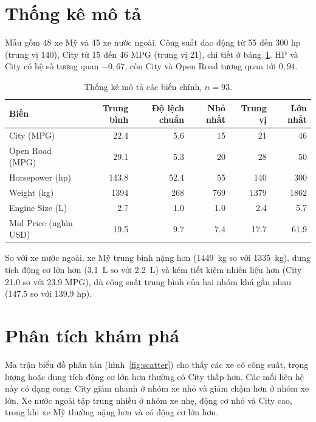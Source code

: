 \documentclass[12pt,a4paper]{report}
\begin{document}
\section{Thống kê mô tả}

Mẫu gồm 48 xe Mỹ và 45 xe nước ngoài. Công suất dao động từ 55 đến 300 hp
(trung vị 140), City từ 15 đến 46 MPG (trung vị 21), chi tiết ở
bảng~\ref{tab:describe}. HP và City có hệ số tương quan $-0{,}67$, còn City và
Open Road tương quan tới $0{,}94$.

\begin{table}[tp]
  \centering
  \caption{Thống kê mô tả các biến chính, $n = 93$.}
  \label{tab:describe}
  \begin{tabular}{lrrrrr}
    \toprule
    Biến & Trung bình & Độ lệch chuẩn & Nhỏ nhất & Trung vị & Lớn nhất \\
    \midrule
    City (MPG)            & \num{22.4} & \num{5.6}  & 15  & 21   & 46 \\
    Open Road (MPG)       & \num{29.1} & \num{5.3}  & 20  & 28   & 50 \\
    Horsepower (hp)       & \num{143.8} & \num{52.4} & 55 & 140  & 300 \\
    Weight (kg)           & \num{1394} & \num{268}  & 769 & \num{1379} & \num{1862} \\
    Engine Size (L)       & \num{2.7}  & \num{1.0}  & \num{1.0} & \num{2.4} & \num{5.7} \\
    Mid Price (nghìn USD) & \num{19.5} & \num{9.7}  & \num{7.4} & \num{17.7} & \num{61.9} \\
    \bottomrule
  \end{tabular}
\end{table}

So với xe nước ngoài, xe Mỹ trung bình nặng hơn (\SI{1449}{kg} so với
\SI{1335}{kg}), dung tích động cơ lớn hơn (\SI{3.1}{L} so với \SI{2.2}{L}) và kém
tiết kiệm nhiên liệu hơn (City \num{21.0} so với \num{23.9} MPG), dù công suất
trung bình của hai nhóm khá gần nhau (\num{147.5} so với \num{139.9} hp).

\section{Phân tích khám phá}
\label{sec:eda}

Ma trận biểu đồ phân tán (hình~\ref{fig:scatter}) cho thấy các xe có công suất,
trọng lượng hoặc dung tích động cơ lớn hơn thường có City thấp hơn. Các mối
liên hệ này có dạng cong: City giảm nhanh ở nhóm xe nhỏ và giảm chậm hơn ở nhóm
xe lớn. Xe nước ngoài tập trung nhiều ở nhóm xe nhẹ, động cơ nhỏ và City cao,
trong khi xe Mỹ thường nặng hơn và có động cơ lớn hơn.
\end{document}
